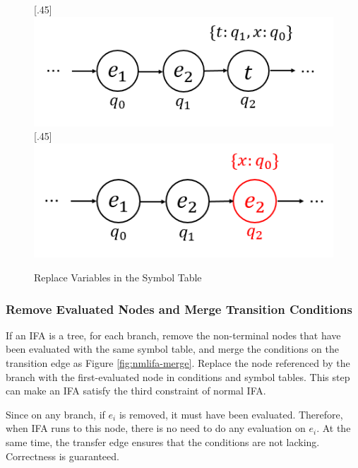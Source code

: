 \begin{figure}[t]
\centering
{}[.45\linewidth]{
    \includegraphics[scale=0.25]{images/nmlifa/nmlifa-replace-1.png}
}
[.45\linewidth]{
    \includegraphics[scale=0.25]{images/nmlifa/nmlifa-replace-2.png}
}
\caption{Replace Variables in the Symbol Table}
\label{fig:nmlifa-replace}
\end{figure}

\subsubsection{Remove Evaluated Nodes and Merge Transition Conditions}

If an IFA is a tree, for each branch, remove the non-terminal nodes that have been evaluated with the same symbol table, and merge the conditions on the transition edge as Figure \ref{fig:nmlifa-merge}. Replace the node referenced by the branch with the first-evaluated node in conditions and symbol tables. This step can make an IFA satisfy the third constraint of normal IFA.

Since on any branch, if $e_i$ is removed, it must have been evaluated. Therefore, when IFA runs to this node, there is no need to do any evaluation on $e_i$. At the same time, the transfer edge ensures that the conditions are not lacking. Correctness is guaranteed.

